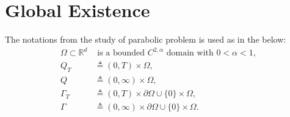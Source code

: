 \documentclass[a4paper,11pt]{article}
\theoremstyle{remark}
\begin{document}
\section{Global Existence}
The notations from the study of parabolic problem is used as in the below:
\begin{align*}
 \Omega \subset \mathbb{R}^d& \text{ is a bounded $C^{2,\alpha}$ domain with $0<\alpha <1$},\\
 Q_T &\triangleq (0,T)\times \Omega,\\
 Q &\triangleq (0,\infty)\times \Omega,\\
 \Gamma_T &\triangleq (0,T)\times \partial\Omega \cup \{0\}\times\Omega,\\
 \Gamma &\triangleq (0,\infty)\times \partial\Omega \cup \{0\}\times\Omega. 
\end{align*}
\end{document}
